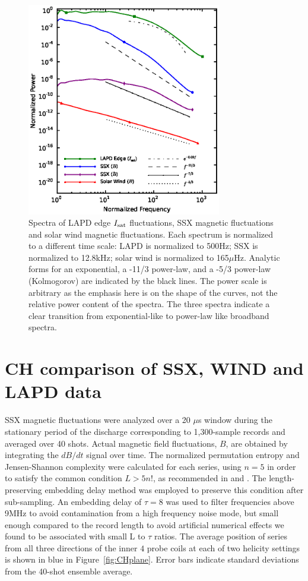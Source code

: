 \documentclass[aps,prx,twocolumn,secnumarabic,nobalancelastpage,amsmath,amssymb,
nofootinbib]{revtex4-1}
\begin{document}
%
\begin{figure}[!htbp]
\centerline{
\includegraphics[width=8.5cm]{figure2.eps}}
\caption{\label{fig:spectra} Spectra of LAPD edge $I_{\rm sat}$ fluctuations, SSX magnetic fluctuations and solar wind magnetic fluctuations. Each spectrum is normalized to a different time scale: LAPD is normalized to 500Hz; SSX is normalized to 12.8kHz; solar wind is normalized to 165$\mu$Hz. Analytic forms for an exponential, a -11/3 power-law, and a -5/3 power-law (Kolmogorov) are indicated by the black lines. The power scale is arbitrary as the emphasis here is on the shape of the curves, not the relative power content of the spectra. The three spectra indicate a clear transition from exponential-like to power-law like broadband spectra.}
\end{figure}
%
\section{CH comparison of SSX, WIND and LAPD data}
SSX magnetic fluctuations were analyzed over a 20 $\mu$s window during the stationary period of the discharge corresponding to 1,300-sample records and averaged over 40 shots. Actual magnetic field fluctuations, $B$, are obtained by integrating the $dB/dt$ signal over time. The normalized permutation entropy and Jensen-Shannon complexity were calculated for each series, using $n=5$ in order to satisfy the common condition $L > 5n!$, as recommended in \cite{amigo2008} and \cite{riedl2013}. The length-preserving embedding delay method was employed to preserve this condition after sub-sampling. An embedding delay of $\tau=8$ was used to filter frequencies above 9MHz to avoid contamination from a high frequency noise mode, but small enough compared to the record length to avoid artificial numerical effects we found to be associated with small L to $\tau$ ratios. The average position of series from all three directions of the inner $4$ probe coils at each of two helicity settings is shown in blue in Figure~\ref{fig:CHplane}. Error bars indicate standard deviations from the 40-shot ensemble average.  
\end{document}
